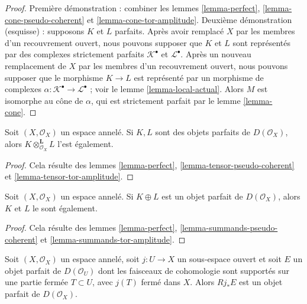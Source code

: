 \begin{proof}

Première démonstration : combiner les lemmes \ref{lemma-perfect}, \ref{lemma-cone-pseudo-coherent} et
\ref{lemma-cone-tor-amplitude}. Deuxième démonstration (esquisse) : supposons $K$ et $L$ parfaits. Après avoir remplacé
$X$ par les membres d'un recouvrement ouvert, nous pouvons supposer que $K$ et $L$
sont représentés par des complexes strictement parfaits $\mathcal{K}^\bullet$
et $\mathcal{L}^\bullet$. Après un nouveau remplacement de $X$ par les membres d'un recouvrement ouvert, nous pouvons supposer que le morphisme $K \to L$ est représenté par un morphisme de complexes $\alpha : \mathcal{K}^\bullet \to \mathcal{L}^\bullet$ ; voir le lemme \ref{lemma-local-actual}. Alors $M$ est isomorphe au cône de $\alpha$, qui est strictement parfait par le lemme \ref{lemma-cone}.

\end{proof}

\begin{lemma}

\label{lemma-tensor-perfect}
Soit $(X, \mathcal{O}_X)$ un espace annelé. Si $K, L$ sont des objets parfaits de $D(\mathcal{O}_X)$, alors $K \otimes_{\mathcal{O}_X}^\mathbf{L} L$ l'est également.
\end{lemma}

\begin{proof}
Cela résulte des lemmes \ref{lemma-perfect}, \ref{lemma-tensor-pseudo-coherent} et \ref{lemma-tensor-tor-amplitude}.
\end{proof}

\begin{lemma}

\label{lemma-summands-perfect}
Soit $(X, \mathcal{O}_X)$ un espace annelé. Si $K \oplus L$ est un objet parfait de $D(\mathcal{O}_X)$, alors $K$ et $L$ le sont également.
\end{lemma}

\begin{proof}
Cela résulte des lemmes \ref{lemma-perfect}, \ref{lemma-summands-pseudo-coherent} et \ref{lemma-summands-tor-amplitude}.
\end{proof}

\begin{lemma}

\label{lemma-pushforward-perfect}
Soit $(X, \mathcal{O}_X)$ un espace annelé, soit $j : U \to X$ un sous-espace ouvert et soit $E$ un objet parfait de $D(\mathcal{O}_U)$ dont les faisceaux de cohomologie sont supportés sur une partie fermée $T \subset U$, avec $j(T)$ fermé dans $X$. Alors $Rj_*E$ est un objet parfait de $D(\mathcal{O}_X)$.
\end{lemma}

